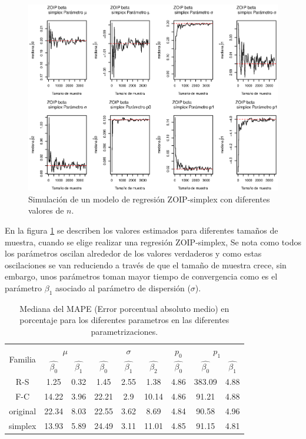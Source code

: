 \begin{figure}
	\begin{center}
		\includegraphics[scale=0.5]{Converg_Simplex.eps}	
		\caption{Simulaci\'{o}n de un modelo de regresi\'{o}n ZOIP-simplex con diferentes valores de $n$.}
		\label{Simu_simplex}
	\end{center}
\end{figure}

En la figura \ref{Simu_simplex} se describen los valores estimados para diferentes tama\~{n}os de muestra, cuando se elige realizar una regresi\'{o}n ZOIP-simplex, Se nota como todos los par\'{a}metros oscilan alrededor de los valores verdaderos y como estas oscilaciones se van reduciendo a trav\'{e}s de que el tama\~{n}o de muestra crece, sin embargo, unos par\'{a}metros toman mayor tiempo de convergencia como es el par\'{a}metro $\beta_1$ asociado al par\'{a}metro de dispersi\'{o}n ($\sigma$).



\begin{table}[!hbt]
{\scriptsize
\begin{center}
\begin{tabular}{|c|cc|ccc|c|cc|}\hline
\multirow{2}{*}{Familia} & \multicolumn{2}{|c|}{$\mu$} & \multicolumn{3}{|c|}{$\sigma$} & $p_0$ & \multicolumn{2}{|c|}{$p_1$} \\ \cline{2-9}
& $\hat{\beta_0}$& $\hat{\beta_1}$& $\hat{\beta_0}$& $\hat{\beta_1}$& $\hat{\beta_2}$& $\hat{\beta_0}$ & $\hat{\beta_0}$ & $\hat{\beta_1}$ \\ \hline \hline
R-S & 1.25 & 0.32 & 1.45 & 2.55 & 1.38 & 4.86 & 383.09 & 4.88 \\ 
F-C & 14.22 & 3.96 & 22.21 & 2.9 & 10.14 & 4.86 & 91.21 & 4.88 \\
original & 22.34 & 8.03 & 22.55 & 3.62 & 8.69 & 4.84 & 90.58 & 4.96 \\
simplex & 13.93 & 5.89 & 24.49 & 3.11 & 11.01 & 4.85 & 91.15 & 4.81 \\ \hline
\end{tabular}
\caption{Mediana del MAPE (Error porcentual absoluto medio) en porcentaje para los diferentes parametros en las diferentes parametrizaciones.}
\label{MAPE}
\end{center}
}
\end{table}

